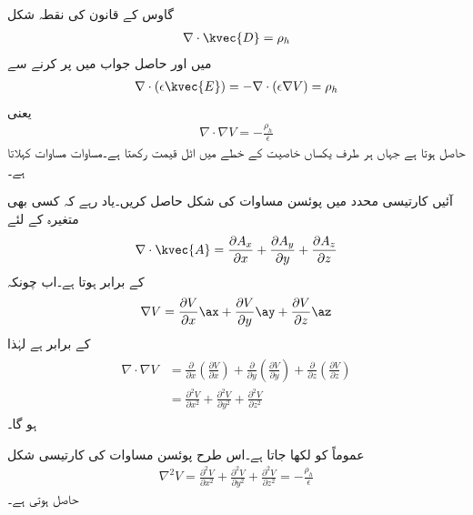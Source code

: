 گاوس کے قانون کی نقطہ شکل
\begin{align}
\nabla \cdot \kvec{D}=\rho_h
\end{align}
میں  اور حاصل جواب میں  پر کرنے سے
\begin{align*}
\nabla \cdot (\epsilon \kvec{E})=-\nabla \cdot (\epsilon \nabla V)=\rho_h 
\end{align*}
یعنی
\begin{align}\label{مساوات_پوئسن_نقطہ}
\nabla \cdot \nabla V=-\frac{\rho_h}{\epsilon}
\end{align}
حاصل ہوتا ہے  جہاں ہر طرف یکساں خاصیت کے خطے میں  اٹل قیمت رکھتا ہے۔مساوات   مساوات  کہلاتا ہے۔

آئیں کارتیسی محدد میں پوئسن مساوات کی شکل حاصل کریں۔یاد رہے کہ کسی بھی متغیرہ  کے لئے
\begin{align*}
\nabla \cdot \kvec{A}=\frac{\partial A_x}{\partial x}+\frac{\partial A_y}{\partial y}+\frac{\partial A_z}{\partial z}
\end{align*}  
کے برابر ہوتا ہے۔اب چونکہ
\begin{align*}
\nabla{V}=\frac{\partial V}{\partial x}\ax+\frac{\partial V}{\partial y}\ay+\frac{\partial V}{\partial z}\az
\end{align*}
 کے برابر ہے لہٰذا
\begin{gather}
\begin{aligned}
\nabla \cdot \nabla V&=\frac{\partial }{\partial x}\left(\frac{\partial V}{\partial x}\right)+\frac{\partial }{\partial y}\left(\frac{\partial V}{\partial y}\right)+\frac{\partial }{\partial z}\left(\frac{\partial V}{\partial z}\right)\\
&=\frac{\partial^2 V}{\partial x^2}+\frac{\partial^2 V}{\partial y^2}+\frac{\partial^2 V}{\partial z^2}
\end{aligned}
\end{gather}
 ہو گا۔

عموماً  کو  لکھا جاتا ہے۔اس طرح پوئسن مساوات کی کارتیسی شکل
\begin{align}\label{مساوات_لاپلاس_پوئسن_کارتیسی_شکل}
\nabla^2 V=\frac{\partial^2 V}{\partial x^2}+\frac{\partial^2 V}{\partial y^2}+\frac{\partial^2 V}{\partial z^2}=-\frac{\rho_h}{\epsilon}
\end{align}
حاصل ہوتی ہے۔ 

